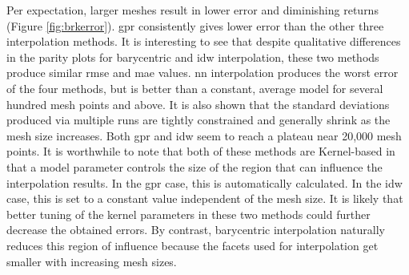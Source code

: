 \documentclass[preprint,12pt]{elsarticle}
\begin{document}
Per expectation, larger meshes result in lower error and diminishing returns (Figure \ref{fig:brkerror}). \Gls{gpr} consistently gives lower error than the other three interpolation methods. It is interesting to see that despite qualitative differences in the parity plots for barycentric and \gls{idw} interpolation, these two methods produce similar \gls{rmse} and \gls{mae} values. \Gls{nn} interpolation produces the worst error of the four methods, but is better than a constant, average model for several hundred mesh points and above. It is also shown that the standard deviations produced via multiple runs are tightly constrained and generally shrink as the mesh size increases. Both \gls{gpr} and \gls{idw} seem to reach a plateau near 20,000 mesh points. It is worthwhile to note that both of these methods are Kernel-based in that a model parameter controls the size of the region that can influence the interpolation results. In the \gls{gpr} case, this is automatically calculated. In the \gls{idw} case, this is set to a constant value independent of the mesh size. It is likely that better tuning of the kernel parameters in these two methods could further decrease the obtained errors. By contrast, barycentric interpolation naturally reduces this region of influence because the facets used for interpolation get smaller with increasing mesh sizes.
    
\end{document}
